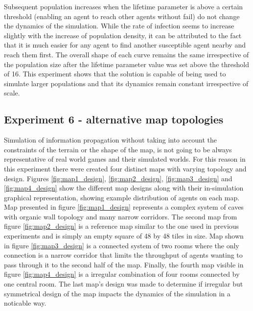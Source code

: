 Subsequent population increases when the lifetime parameter is above a certain threshold (enabling an agent to reach other agents without fail) do not change the dynamics of the simulation.
While the rate of infection seems to increase slightly with the increase of population density, it can be attributed to the fact that it is much easier for any agent to find another susceptible agent nearby and reach them first.
The overall shape of each curve remains the same irrespective of the population size after the lifetime parameter value was set above the threshold of 16.
This experiment shows that the solution is capable of being used to simulate larger populations and that its dynamics remain constant irrespective of scale.

\subsection{Experiment 6 - alternative map topologies}

Simulation of information propagation without taking into account the constraints of the terrain or the shape of the map, is not going to be always representative of real world games and their simulated worlds.
For this reason in this experiment there were created four distinct maps with varying topology and design.
Figures \ref{fig:map1_design}, \ref{fig:map2_design}, \ref{fig:map3_design} and \ref{fig:map4_design} show the different map designs along with their in-simulation graphical representation, showing example distribution of agents on each map.
Map presented in figure \ref{fig:map1_design} represents a complex system of caves with organic wall topology and many narrow corridors.
The second map from figure \ref{fig:map2_design} is a reference map similar to the one used in previous experiments and is simply an empty square of 48 by 48 tiles in size.
Map shown in figure \ref{fig:map3_design} is a connected system of two rooms where the only connection is a narrow corridor that limits the throughput of agents wanting to pass through it to the second half of the map.
Finally, the fourth map visible in figure \ref{fig:map4_design} is a irregular combination of four rooms connected by one central room.
The last map's design was made to determine if irregular but symmetrical design of the map impacts the dynamics of the simulation in a noticable way.


